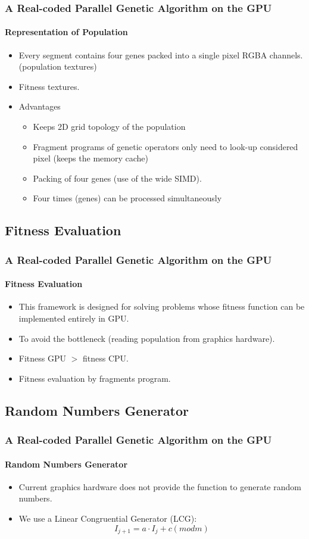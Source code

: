 \frame
{
\frametitle{A Real-coded Parallel Genetic Algorithm on the GPU}
\framesubtitle{Representation of Population}
\begin{itemize}
	\item Every segment contains four genes packed into a single pixel RGBA channels. (population textures)
	\item Fitness textures.
	\item Advantages
	\begin{itemize}
		\item Keeps 2D grid topology of the population
		\item Fragment programs of genetic operators only need to look-up considered pixel (keeps the memory cache)
		\item Packing of four genes (use of the wide SIMD).
		\item Four times (genes) can be processed simultaneously
	\end{itemize}
\end{itemize}
}

\subsection{Fitness Evaluation}
\frame
{
\frametitle{A Real-coded Parallel Genetic Algorithm on the GPU}
\framesubtitle{Fitness Evaluation}
\begin{itemize}
	\item This framework is designed for solving problems whose fitness function can be implemented entirely in GPU.
	\item To avoid the bottleneck (reading population from graphics hardware).
	\item Fitness GPU $>$ fitness CPU.
	\item Fitness evaluation by fragments program. 
\end{itemize}
}
\subsection{Random Numbers Generator}
\frame
{
\frametitle{A Real-coded Parallel Genetic Algorithm on the GPU}
\framesubtitle{Random Numbers Generator}
\begin{itemize}
	\item Current graphics hardware does not provide the function to generate random numbers.
	\item We use a Linear Congruential Generator (LCG):
	$$I_{j+1} = a\cdot I_{j} + c (mod m)$$
\end{itemize}
}
